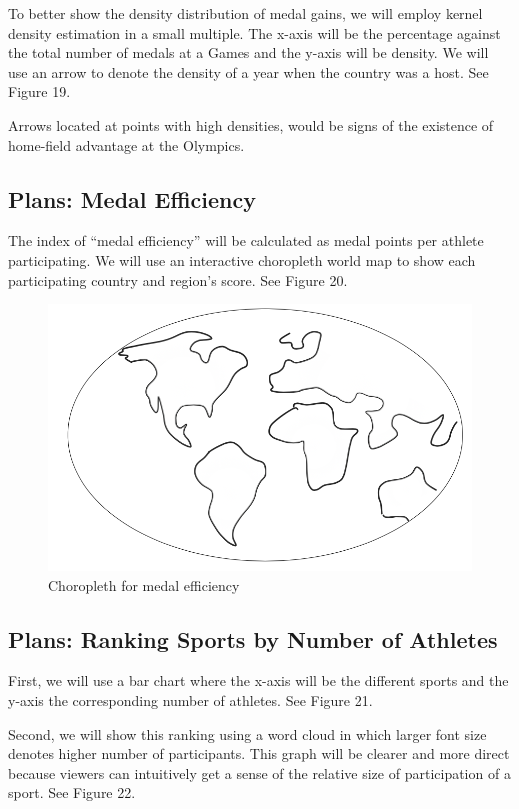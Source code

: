 \documentclass[12pt]{article}
\begin{document}
To better show the density distribution of medal gains, we will employ kernel density estimation in a small multiple. The x-axis will be the percentage against the total number of medals at a Games and the y-axis will be density. We will use an arrow to denote the density of a year when the country was a host. See Figure 19.

Arrows located at points with high densities, would be signs of the existence of home-field advantage at the Olympics. 

\subsection{Plans: Medal Efficiency}
The index of “medal efficiency” will be calculated as medal points per athlete participating. We will use an interactive choropleth world map to show each participating country and region’s score. See Figure 20.

\begin{figure}[!b]
    \centering
    \includegraphics[scale=0.5]{pics/9.png}
    \caption{Choropleth for medal efficiency}
    \label{fig:my_label}
\end{figure}

\subsection{Plans: Ranking Sports by Number of Athletes}
First, we will use a bar chart where the x-axis will be the different sports and the y-axis the corresponding number of athletes. See Figure 21. 


Second, we will show this ranking using a word cloud in which larger font size denotes higher number of participants. This graph will be clearer and more direct because viewers can intuitively get a sense of the relative size of participation of a sport. See Figure 22.
\end{document}
